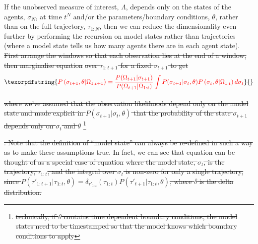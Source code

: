 \documentclass{article}
\providecommand{\DIFdeltex}[1]{{\protect\color{red}\sout{#1}}}                      %
\providecommand{\DIFdelbegin}{} %
\providecommand{\DIFdel}[1]{\texorpdfstring{\DIFdeltex{#1}}{}} %
\newcommand{\DIFscaledelfig}{0.5}
\newlength{\DIFdelgraphicswidth} %
\newlength{\DIFdelgraphicsheight} %
\newcommand{\DIFdelincludegraphics}[2][]{%
\sbox{\DIFdelgraphicsbox}{\DIFOincludegraphics[#1]{#2}}%
\settoboxwidth{\DIFdelgraphicswidth}{\DIFdelgraphicsbox} %
\settoboxtotalheight{\DIFdelgraphicsheight}{\DIFdelgraphicsbox} %
\scalebox{\DIFscaledelfig}{%
\parbox[b]{\DIFdelgraphicswidth}{\usebox{\DIFdelgraphicsbox}\\[-\baselineskip] \rule{\DIFdelgraphicswidth}{0em}}\llap{\resizebox{\DIFdelgraphicswidth}{\DIFdelgraphicsheight}{%
\setlength{\unitlength}{\DIFdelgraphicswidth}%
\begin{picture}(1,1)%
\thicklines\linethickness{2pt} %
{\color[rgb]{1,0,0}\put(0,0){\framebox(1,1){}}}%
{\color[rgb]{1,0,0}\put(0,0){\line( 1,1){1}}}%
{\color[rgb]{1,0,0}\put(0,1){\line(1,-1){1}}}%
\end{picture}%
}\hspace*{3pt}}} %
} %
\DeclareRobustCommand{\DIFdelbegin}{\DIFOdelbegin \let\includegraphics\DIFdelincludegraphics} %
\begin{document}
If the unobserved measure of interest, $\Lambda$, depends only on the states of the agents, $\sigma_N$, at time $t^N$ and/or the parameters/boundary conditions, $\theta$, rather than on the full trajectory, $\tau_{1:N}$, then we can reduce the dimensionality even further by performing the recursion on model states rather than trajectories (where a model state tells us how many agents there are in each agent state). \DIFdelbegin \DIFdel{First arrange the windows so that each observation lies at the end of a window, then marginalise equation }%
\DIFdel{over $\tau_{1:t+1}$ for a fixed $\sigma_{t+1}$ to get
}\begin{displaymath}
\DIFdel{P\left(\sigma_{t+1}, \theta | \Omega_{1:t+1}\right)
=
\frac{ P(\Omega_{t+1}|\sigma_{t+1}) 
}{	P(\Omega_{t+1}| \Omega_{1:t}) }
\int P(\sigma_{t+1}|\sigma_t,\theta)P\left(\sigma_{t},\theta| \Omega_{1:t}\right) d \sigma_t
}\end{displaymath}%
\DIFdel{where we've assumed that the observation likelihoods depend only on the model state and made explicit in $P(\sigma_{t+1}|\sigma_t,\theta)$ that the probability of the state $\sigma_{t+1}$ depends only on $\sigma_t$ and $\theta$  }\footnote{\DIFdel{technically, if $\theta$ contains time dependent boundary conditions, the model states need to be timestamped so that the model knows which boundary conditions to apply}}%
\addtocounter{footnote}{-1}%
\DIFdel{.   Note that the definition of ``model state'' can always be re-defined in such a way as to make these assumptions true. In fact, we can see that equation }%
\DIFdel{can be thought of as a special case of equation }%
\DIFdel{where the model state, $\sigma_t$, is the trajectory, $\tau_{1:t}$, and the integral over $\sigma_t$ is non-zero for only a single trajectory, since $P(\tau'_{1:t+1}|\tau_{1:t},\theta) = \delta_{\tau'_{1:t}}(\tau_{1:t})P(\tau'_{t+1}|\tau_{1:t},\theta)$, where $\delta$ is the delta distribution.
}%
\end{document}
